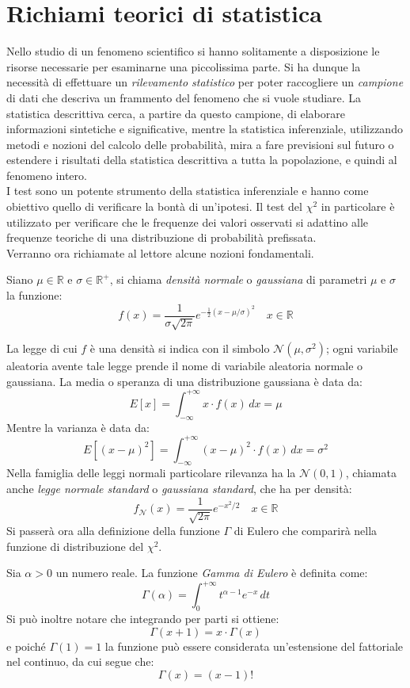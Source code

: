 \chapter{Richiami teorici di statistica}
Nello studio di un fenomeno scientifico si hanno solitamente a disposizione le risorse necessarie per esaminarne una piccolissima parte. Si ha dunque la necessità di effettuare un \textit{rilevamento statistico} per poter raccogliere un \textit{campione} di dati che descriva un frammento del fenomeno che si vuole studiare. La statistica descrittiva cerca, a partire da questo campione, di elaborare informazioni sintetiche e significative, mentre la statistica inferenziale, utilizzando metodi e nozioni del calcolo delle probabilità, mira a fare previsioni sul futuro o estendere i risultati della statistica descrittiva a tutta la popolazione, e quindi al fenomeno intero.\\
		I test sono un potente strumento della statistica inferenziale e hanno come obiettivo quello di verificare la bontà di un'ipotesi. Il test del $\chi ^2$ in particolare è utilizzato per verificare che le frequenze dei valori osservati si adattino alle frequenze teoriche di una distribuzione di probabilità prefissata.\\ Verranno ora richiamate al lettore alcune nozioni fondamentali.\\
		\begin{defn}
		Siano $\mu \in \mathbb{R}$ e $\sigma \in \mathbb{R} ^+$, si chiama \textit{densità normale} o \textit{gaussiana} di parametri $\mu$ e $\sigma$ la funzione:
		\[ f(x) = \frac{1}{\sigma \sqrt{2\pi}}e^{-\frac{1}{2} ( x-\mu / \sigma )^2 } \quad x\in\mathbb{R}\]
		\end{defn}
		\noindent La legge di cui $f$ è una densità si indica con il simbolo $\mathcal{N}(\mu ,\sigma ^2)$; ogni variabile aleatoria avente
tale legge prende il nome di variabile aleatoria normale o gaussiana. La media o speranza di una distribuzione gaussiana è data da:
\[E[x]=\int_{-\infty}^{+\infty}x\cdot f(x)\, dx=\mu \]
Mentre la varianza è data da:
\[E[(x-\mu )^2]=\int_{-\infty}^{+\infty}(x-\mu )^2 \cdot f(x)\, dx=\sigma ^2 \]
Nella famiglia delle leggi normali particolare rilevanza ha la $\mathcal{N}(0 ,1)$, chiamata anche \textit{legge normale standard} o \textit{gaussiana standard}, che ha per densità:
\[ f_{\mathcal{N}}(x) = \frac{1}{\sqrt{2\pi}}e^{-{x^2}/{2}} \quad x\in\mathbb{R}\]
Si passerà ora alla definizione della funzione $\Gamma$ di Eulero che comparirà nella funzione di distribuzione del $\chi ^2$.	
		\begin{defn}
		 Sia $\alpha > 0$ un numero reale. La funzione \textit{Gamma di Eulero} è definita come:
			\[\Gamma(\alpha)=\int_{0}^{+\infty}t^{\alpha-1}e^{-x}\, dt\]
			Si può inoltre notare che integrando per parti si ottiene:
			\[\Gamma(x+1)=x\cdot \Gamma(x)\]
			e poiché $\Gamma(1)=1$ la funzione può essere considerata un'estensione del fattoriale nel continuo, da cui segue che:
			\[\Gamma(x)=(x-1)!\]
		\end{defn}
